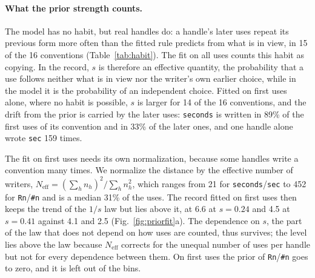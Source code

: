 \documentclass[10pt]{article}
\begin{document}
\paragraph{What the prior strength counts.} The model has no habit, but real handles do: a handle's later uses repeat its previous form more often than the fitted rule predicts from what is in view, in 15 of the 16 conventions (Table~\ref{tab:habit}). The fit on all uses counts this habit as copying. In the record, $s$ is therefore an effective quantity, the probability that a use follows neither what is in view nor the writer's own earlier choice, while in the model it is the probability of an independent choice. Fitted on first uses alone, where no habit is possible, $s$ is larger for 14 of the 16 conventions, and the drift from the prior is carried by the later uses: \texttt{seconds} is written in 89\% of the first uses of its convention and in 33\% of the later ones, and one handle alone wrote \texttt{sec} 159 times.

The fit on first uses needs its own normalization, because some handles write a convention many times. We normalize the distance by the effective number of writers, $N_\mathrm{eff}=(\sum_h n_h)^2/\sum_h n_h^2$, which ranges from 21 for \texttt{seconds}/\texttt{sec} to 452 for \texttt{Rn}/\texttt{\#n} and is a median 31\% of the uses. The record fitted on first uses then keeps the trend of the $1/s$ law but lies above it, at 6.6 at $s=0.24$ and 4.5 at $s=0.41$ against 4.1 and 2.5 (Fig.~\ref{fig:priorfit}a). The dependence on $s$, the part of the law that does not depend on how uses are counted, thus survives; the level lies above the law because $N_\mathrm{eff}$ corrects for the unequal number of uses per handle but not for every dependence between them. On first uses the prior of \texttt{Rn}/\texttt{\#n} goes to zero, and it is left out of the bins.

\begin{table}[htbp]\centering\small
\caption{\textbf{The habit of repeating one's own form.} For each kept convention: the uses, the share that are a handle's first use, the effective number of independent writers, the share of later uses that repeat the handle's previous form and the share the fitted rule predicts from what is in view, the share of form A on first and on later uses, and the prior strength fitted on all uses and on first uses only, with the 95\% profile-likelihood interval of the latter.}\label{tab:habit}
\resizebox{\textwidth}{!}{}
\end{table}
\end{document}

